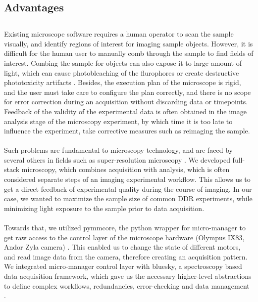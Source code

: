 \subsection{Advantages}
\subsection{}

\paragraph*{} Existing microscope software requires a human operator to scan the sample visually, and identify regions of interest for imaging sample objects. However, it is difficult for the human user to manually comb through the sample to find fields of interest. Combing the sample for objects can also expose it to large amount of light, which can cause photobleaching of the flurophores or create destructive phototoxicity artifacts \cite{scherf2015smart}. Besides, the execution plan of the microscope is rigid, and the user must take care to configure the plan correctly, and there is no scope for error correction during an acquisition without discarding data or timepoints. Feedback of the validity of the experimental data is often obtained in the image analysis stage of the microscopy experiment, by which time it is too late to influence the experiment, take corrective measures such as reimaging the sample.

\paragraph*{} Such problems are fundamental to microscopy technology, and are faced by several others in fields such as super-resolution microscopy \cite{D1SC05506B}. We developed full-stack microscopy, which combines acquisition with analysis, which is often considered separate steps of an imaging experimental workflow. This allows us to get a direct feedback of experimental quality during the course of imaging. In our case, we wanted to maximize the sample size of common DDR experiments, while minimizing light exposure to the sample prior to data acquisition.

\paragraph*{} Towards that, we utilized pymmcore, the python wrapper for micro-manager to get raw access to the control layer of the microscope hardware (Olympus IX83, Andor Zyla camera) \cite{edelstein2014advanced}. This enabled us to change the state of different motors, and read image data from the camera, therefore creating an acquisition pattern. We integrated micro-manager control layer with bluesky, a spectroscopy based data acquisition framework, which gave us the necessary higher-level abstractions to define complex workflows, redundancies, error-checking and data management \cite{allan2019bluesky}.

